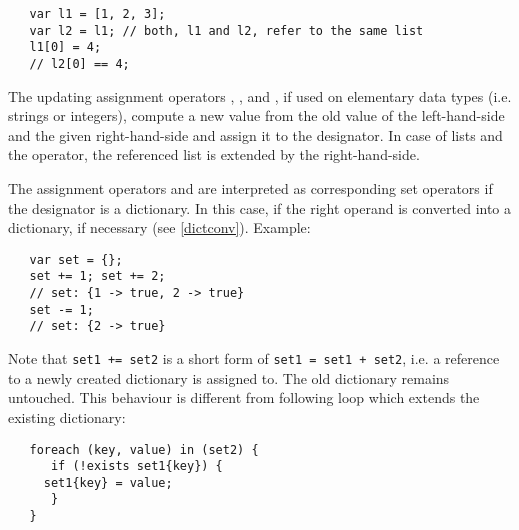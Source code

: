 \begin{lstlisting}
   var l1 = [1, 2, 3];
   var l2 = l1; // both, l1 and l2, refer to the same list
   l1[0] = 4;
   // l2[0] == 4;
\end{lstlisting}

\noindent
The updating assignment operators \token{\&=}, \token{+=}, and \token{-=},
if used on elementary data types (i.e. strings or integers),
compute a new value from the old value of the left-hand-side
and the given right-hand-side and assign it to the designator.
In case of lists and the \token{\&=} operator, the referenced list
is extended by the right-hand-side.

\label{setassignment}
The assignment operators \token{+=} and \token{-=} are interpreted
as corresponding set operators if the designator is a
dictionary.
In this case, if the right operand is converted into a dictionary,
if necessary (see \ref{dictconv}). Example:

\begin{lstlisting}
   var set = {};
   set += 1; set += 2;
   // set: {1 -> true, 2 -> true}
   set -= 1;
   // set: {2 -> true}
\end{lstlisting}

\noindent
Note that \lstinline!set1 += set2! is a short form of
\lstinline!set1 = set1 + set2!, i.e. a reference to a newly
created dictionary is assigned to. The old dictionary remains
untouched. This behaviour is different from following loop
which extends the existing dictionary:

\begin{lstlisting}
   foreach (key, value) in (set2) {
      if (!exists set1{key}) {
	 set1{key} = value;
      }
   }
\end{lstlisting}

\endinput
